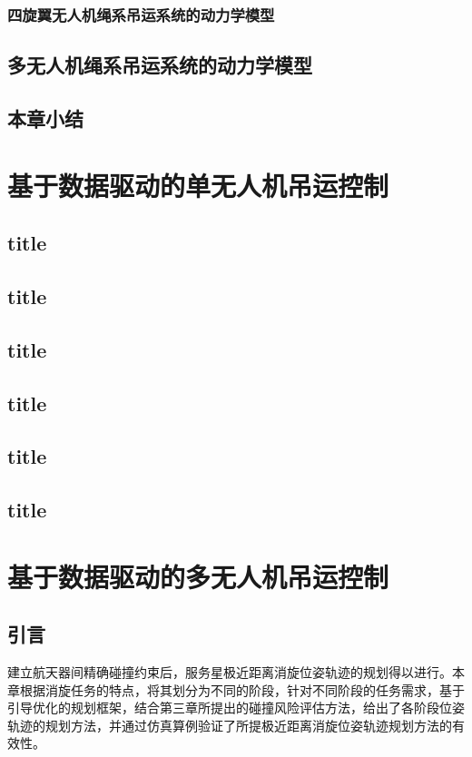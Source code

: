 \documentclass[lang=chs, degree=master, blindreview=false, winfonts=true]{yanputhesis}
\begin{document}
\subsection{四旋翼无人机绳系吊运系统的动力学模型}
\section{多无人机绳系吊运系统的动力学模型}




\section{本章小结}

\cleardoublepage

\chapter{基于数据驱动的单无人机吊运控制}

\section{title}
\section{title}
\section{title}
\section{title}
\section{title}
\section{title}

\cleardoublepage

\chapter{基于数据驱动的多无人机吊运控制}

\section{引言}
建立航天器间精确碰撞约束后，服务星极近距离消旋位姿轨迹的规划得以进行。本章根据消旋任务的特点，将其划分为不同的阶段，针对不同阶段的任务需求，基于引导优化的规划框架，结合第三章所提出的碰撞风险评估方法，给出了各阶段位姿轨迹的规划方法，并通过仿真算例验证了所提极近距离消旋位姿轨迹规划方法的有效性。
\end{document}
